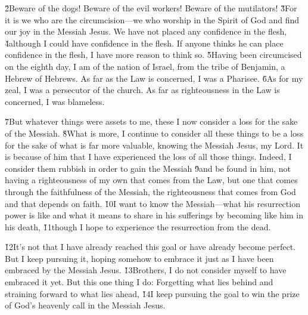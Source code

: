 \v{2}Beware of the dogs! Beware of the evil workers! Beware of the mutilators! \v{3}For it is we who are the circumcision---we who worship in the Spirit of God and find our joy in the Messiah Jesus. We have not placed any confidence in the flesh, \v{4}although I could have confidence in the flesh. If anyone thinks he can place confidence in the flesh, I have more reason to think so. \v{5}Having been circumcised on the eighth day, I am of the nation of Israel, from the tribe of Benjamin, a Hebrew of Hebrews. As far as the Law is concerned, I was a Pharisee. \v{6}As for my zeal, I was a persecutor of the church. As far as righteousness in the Law is concerned, I was blameless.

\v{7}But whatever things were assets to me, these I now consider a loss for the sake of the Messiah. \v{8}What is more, I continue to consider all these things to be a loss for the sake of what is far more valuable, knowing the Messiah Jesus, my Lord. It is because of him that I have experienced the loss of all those things. Indeed, I consider them rubbish in order to gain the Messiah \v{9}and be found in him, not having a righteousness of my own that comes from the Law, but one that comes through the faithfulness of the Messiah, the righteousness that comes from God and that depends on faith. \v{10}I want to know the Messiah---what his resurrection power is like and what it means to share in his sufferings by becoming like him in his death, \v{11}though I hope to experience the resurrection from the dead.

\v{12}It's not that I have already reached this goal or have already become perfect. But I keep pursuing it, hoping somehow to embrace it just as I have been embraced by the Messiah Jesus. \v{13}Brothers, I do not consider myself to have embraced it yet. But this one thing I do: Forgetting what lies behind and straining forward to what lies ahead, \v{14}I keep pursuing the goal to win the prize of God's heavenly call in the Messiah Jesus.

